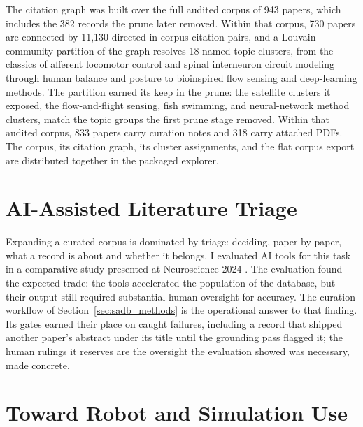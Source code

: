 The citation graph was built over the full audited corpus of 943 papers, which includes the 382 records the prune later removed. Within that corpus, 730 papers are connected by 11,130 directed in-corpus citation pairs, and a Louvain community partition of the graph resolves 18 named topic clusters, from the classics of afferent locomotor control and spinal interneuron circuit modeling through human balance and posture to bioinspired flow sensing and deep-learning methods. The partition earned its keep in the prune: the satellite clusters it exposed, the flow-and-flight sensing, fish swimming, and neural-network method clusters, match the topic groups the first prune stage removed. Within that audited corpus, 833 papers carry curation notes and 318 carry attached PDFs. The corpus, its citation graph, its cluster assignments, and the flat corpus export are distributed together in the packaged explorer.

\section{AI-Assisted Literature Triage}\label{sec:sadb_triage}

Expanding a curated corpus is dominated by triage: deciding, paper by paper, what a record is about and whether it belongs. I evaluated AI tools for this task in a comparative study presented at Neuroscience 2024 \citep{bolen_using_2024}. The evaluation found the expected trade: the tools accelerated the population of the database, but their output still required substantial human oversight for accuracy. The curation workflow of Section~\ref{sec:sadb_methods} is the operational answer to that finding. Its gates earned their place on caught failures, including a record that shipped another paper's abstract under its title until the grounding pass flagged it; the human rulings it reserves are the oversight the evaluation showed was necessary, made concrete.

\section{Toward Robot and Simulation Use}\label{sec:sadb_use}

